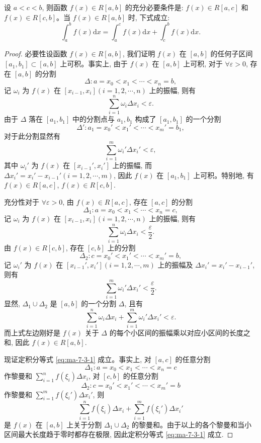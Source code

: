 \begin{theorem}\label{theorem:ma-7-3-3}
设 $a<c<b$, 则函数 $f(x)\in R[a,b]$ 的充分必要条件是: $f(x)\in R[a,c]$ 和 $f(x)\in R[c,b]$。当 $f(x)\in R[a,b]$ 时, 下式成立:
\begin{equation}
  \int_a^b f(x)\mathrm dx=\int_a^c f(x)\mathrm dx+\int_c^b f(x)\mathrm dx.
  \label{eq:ma-7-3-1}
\end{equation}
\end{theorem}


\begin{proof}
必要性\quad 设函数 $f(x)\in R[a,b]$, 我们证明 $f(x)$ 在 $[a,b]$ 的任何子区间 $[a_1,b_1]\subset[a,b]$ 上可积。事实上, 由于 $f(x)$ 在 $[a,b]$ 上可积, 对于 $\forall\varepsilon>0$, 存在 $[a,b]$ 的分割
\[
  \Delta:a=x_0<x_1<\cdots<x_n=b,
\]
记 $\omega_i$ 为 $f(x)$ 在 $[x_{i-1},x_i](i=1,2,\cdots,n)$ 上的振幅, 则有
\[
  \sum_{i=1}^n \omega_i\Delta x_i<\varepsilon.
\]
由于 $\Delta$ 落在 $[a_1,b_1]$ 中的分割点与 $a_1,b_1$ 构成了 $[a_1,b_1]$ 的一个分割
\[
  \Delta':a_1=x_0'<x_1'<\cdots<x_m'=b_1,
\]
对于此分割显然有
\[
  \sum_{i=1}^m \omega_i'\Delta x_i'<\varepsilon,
\]
其中 $\omega_i'$ 为 $f(x)$ 在 $[x_{i-1}',x_i']$ 上的振幅, 而 $\Delta x_i'=x_i'-x_{i-1}'(i=1,2,\cdots,m)$, 因此 $f(x)$ 在 $[a_1,b_1]$ 上可积。特别地, 有 $f(x)\in R[a,c]$, $f(x)\in R[c,b]$.

充分性\quad 对于 $\forall\varepsilon>0$, 由 $f(x)\in R[a,c]$, 存在 $[a,c]$ 的分割
\[
  \Delta_1:a=x_0<x_1<\cdots<x_n=c,
\]
记 $\omega_i$ 为 $f(x)$ 在 $[x_{i-1},x_i](i=1,2,\cdots,n)$ 上的振幅, 则有
\[
  \sum_{i=1}^n\omega_i\Delta x_i<\frac{\varepsilon}{2}.
\]
由 $f(x)\in R[c,b]$, 存在 $[c,b]$ 上的分割
\[
  \Delta_2:c=x_0'<x_1'<\cdots<x_m'=b,
\]
记 $\omega_i'$ 为 $f(x)$ 在 $[x_{i-1}',x_i'](i=1,2,\cdots,m)$ 上的振幅及 $\Delta x_i'=x_i'-x_{i-1}'$, 则有
\[
  \sum_{i=1}^m\omega_i'\Delta x_i'<\frac{\varepsilon}{2}.
\]
显然, $\Delta_1\cup\Delta_2$ 是 $[a,b]$ 的一个分割 $\Delta$, 且有
\[
  \sum_{i=1}^n\omega_i\Delta x_i+\sum_{i=1}^m\omega_i'\Delta x_i'<\varepsilon.
\]
而上式左边刚好是 $f(x)$ 关于 $\Delta$ 的每个小区间的振幅乘以对应小区间的长度之和, 因此 $f(x)\in R[a,b]$.

现证定积分等式 \eqref{eq:ma-7-3-1} 成立。事实上, 对 $[a,c]$ 的任意分割
\[
  \Delta_1:a=x_0<x_1<\cdots<x_n=c
\]
作黎曼和 $\sum_{i=1}^n f(\xi_i)\Delta x_i$, 对 $[c,b]$ 的任意分割
\[
  \Delta_2:c=x_0'<x_1'<\cdots<x_m'=b
\]
作黎曼和 $\sum_{i=1}^m f(\xi_i')\Delta x_i'$, 则
\[
  \sum_{i=1}^n f(\xi_i)\Delta x_i+\sum_{i=1}^m f(\xi_i')\Delta x_i'
\]
是 $f(x)$ 在 $[a,b]$ 上关于分割 $\Delta_1\cup\Delta_2$ 的黎曼和。由于以上的各个黎曼和当小区间最大长度趋于零时都存在极限, 因此定积分等式 \eqref{eq:ma-7-3-1} 成立.
\end{proof}


